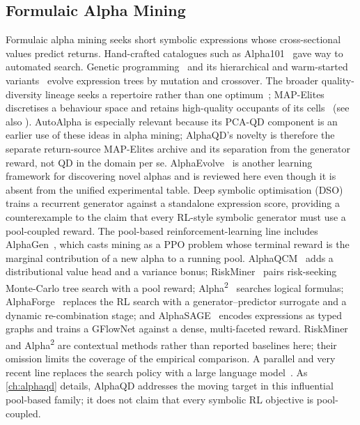 \subsection{Formulaic Alpha Mining}
\label{sec:bg_alpha}

Formulaic alpha mining seeks short symbolic expressions whose cross-sectional values predict returns. Hand-crafted catalogues such as Alpha101~\cite{kakushadze2016101} gave way to automated search. Genetic programming~\cite{stephens2015gplearn} and its hierarchical and warm-started variants~\cite{zhang2020autoalpha,ren2024warmstart} evolve expression trees by mutation and crossover. The broader quality-diversity lineage seeks a repertoire rather than one optimum~\cite{pugh2016quality}; MAP-Elites discretises a behaviour space and retains high-quality occupants of its cells~\cite{mouret2015mapelites} (see also ). AutoAlpha is especially relevant because its PCA-QD component is an earlier use of these ideas in alpha mining; AlphaQD's novelty is therefore the separate return-source MAP-Elites archive and its separation from the generator reward, not QD in the domain per se. AlphaEvolve~\cite{cui2021alphaevolve} is another learning framework for discovering novel alphas and is reviewed here even though it is absent from the unified experimental table. Deep symbolic optimisation (DSO)~\cite{petersen2021dso} trains a recurrent generator against a standalone expression score, providing a counterexample to the claim that every RL-style symbolic generator must use a pool-coupled reward. The pool-based reinforcement-learning line includes AlphaGen~\cite{yu2023alphagen}, which casts mining as a PPO problem whose terminal reward is the marginal contribution of a new alpha to a running pool. AlphaQCM~\cite{zhu2025alphaqcm} adds a distributional value head and a variance bonus; RiskMiner~\cite{ren2024riskminer} pairs risk-seeking Monte-Carlo tree search with a pool reward; Alpha\textsuperscript{2}~\cite{xu2024alpha2} searches logical formulas; AlphaForge~\cite{shi2025alphaforge} replaces the RL search with a generator--predictor surrogate and a dynamic re-combination stage; and AlphaSAGE~\cite{chen2025alphasage} encodes expressions as typed graphs and trains a GFlowNet against a dense, multi-faceted reward. RiskMiner and Alpha\textsuperscript{2} are contextual methods rather than reported baselines here; their omission limits the coverage of the empirical comparison. A parallel and very recent line replaces the search policy with a large language model~\cite{wang2025alphagpt,tang2025alphaagent,li2024fama}. As \cref{ch:alphaqd} details, AlphaQD addresses the moving target in this influential pool-based family; it does not claim that every symbolic RL objective is pool-coupled.

